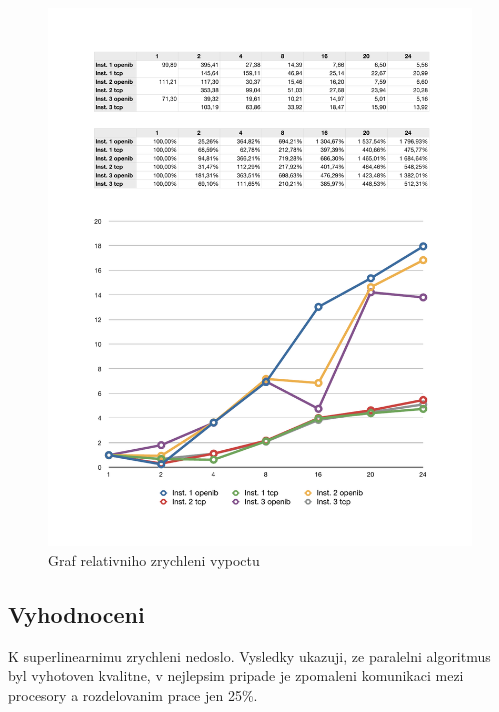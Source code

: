 \documentclass[a4paper]{article}
\begin{document}
\begin{figure}[ht]
\centerline{\includegraphics[width=\textwidth]{graph.pdf}}
\caption{Graf relativniho zrychleni vypoctu}
\label{graph}
\end{figure}

\subsection{Vyhodnoceni}
K superlinearnimu zrychleni nedoslo. Vysledky ukazuji, ze paralelni algoritmus byl vyhotoven
kvalitne, v nejlepsim pripade je zpomaleni komunikaci mezi procesory a rozdelovanim prace
jen 25\%.
\end{document}
